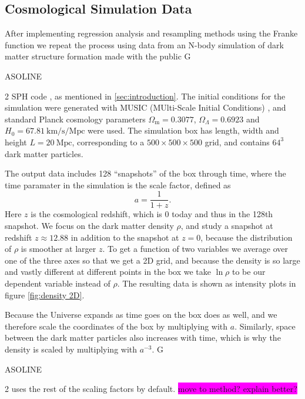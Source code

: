 \documentclass[aps,pra,english,notitlepage,reprint,nofootinbib]{revtex4-1}  %
\begin{document}
\subsection{Cosmological Simulation Data}\label{subsec:simulation}
After implementing regression analysis and resampling methods using the Franke function we repeat the process using data from an N-body simulation of dark matter structure formation made with the public G\begin{footnotesize}ASOLINE\end{footnotesize}2 SPH code \cite{gasoline}, as mentioned in \cref{sec:introduction}. The initial conditions for the simulation were generated with MUSIC (MUlti-Scale Initial Conditions) \cite{music}, and standard Planck cosmology parameters $\Omega_\text{m}=0.3077$, $\Omega_{\Lambda}=0.6923$ and $H_0=67.81\:\text{km/s/Mpc}$ were used. The simulation box has length, width and height $L=20\:\text{Mpc}$, corresponding to a $500\times500\times500$ grid, and contains $64^3$ dark matter particles. 

The output data includes 128 ``snapshots'' of the box through time, where the time paramater in the simulation is the scale factor, defined as
\begin{equation}
  a = \frac{1}{1+z}.
\end{equation}
Here $z$ is the cosmological redshift, which is 0 today and thus in the 128th snapshot. We focus on the dark matter density $\rho$, and study a snapshot at redshift $z\approx12.88$ in addition to the snapshot at $z=0$, because the distribution of $\rho$ is smoother at larger $z$. To get a function of two variables we average over one of the three axes so that we get a 2D grid, and because the density is so large and vastly different at different points in the box we take $\ln\rho$ to be our dependent variable instead of $\rho$. The resulting data is shown as intensity plots in figure \ref{fig:density 2D}. 

Because the Universe expands as time goes on the box does as well, and we therefore scale the coordinates of the box by multiplying with $a$. Similarly, space between the dark matter particles also increases with time, which is why the density is scaled by multiplying with $a^{-3}$. G\begin{footnotesize}ASOLINE\end{footnotesize}2 uses the rest of the scaling factors by default. \colorbox{magenta}{move to method? explain better?}
\end{document}

